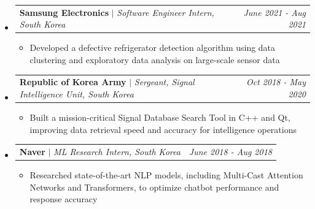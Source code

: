 \documentclass[10pt]{article}
\makeatletter
\newcommand{\resumeItem}[1]{\item\small{#1}}
\newcommand{\resumeCompactHeading}[3]{
  \vspace{-2pt}\item[]
    \begin{tabular*}{\linewidth}[t]{l@{\extracolsep{\fill}}r}
      \textbf{#1} $|$ \textit{\small #2} & \textit{\small #3} \\
    \end{tabular*}\vspace{-5pt}
}
\makeatother
\begin{document}
\begin{itemize}[leftmargin=0.15in, label={}, itemsep=0pt]
    \resumeCompactHeading
        {Samsung Electronics}{Software Engineer Intern, South Korea}{June 2021 - Aug 2021}
        \begin{itemize}[leftmargin=0.2in, itemsep=0pt]
            \resumeItem{Developed a defective refrigerator detection algorithm using data clustering and exploratory data analysis on large-scale sensor data}
        \end{itemize}

    \resumeCompactHeading
        {Republic of Korea Army}{Sergeant, Signal Intelligence Unit, South Korea}{Oct 2018 - May 2020}
        \begin{itemize}[leftmargin=0.2in, itemsep=0pt]
            \resumeItem{Built a mission-critical Signal Database Search Tool in C++ and Qt, improving data retrieval speed and accuracy for intelligence operations}
        \end{itemize}

    \resumeCompactHeading
        {Naver}{ML Research Intern, South Korea}{June 2018 - Aug 2018}
        \begin{itemize}[leftmargin=0.2in, itemsep=0pt]
            \resumeItem{Researched state-of-the-art NLP models, including Multi-Cast Attention Networks and Transformers, to optimize chatbot performance and response accuracy}
        \end{itemize}

\end{itemize}

\end{document}
